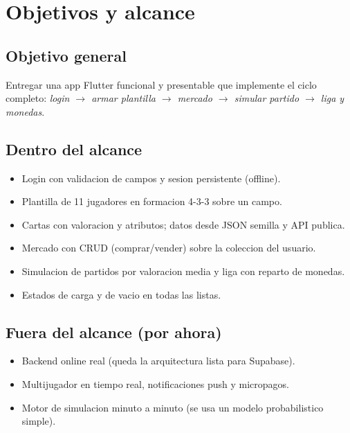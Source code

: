 \documentclass[11pt,a4paper]{article}
\begin{document}
\section{Objetivos y alcance}
\subsection*{Objetivo general}
Entregar una app Flutter funcional y presentable que implemente el ciclo completo:
\emph{login $\rightarrow$ armar plantilla $\rightarrow$ mercado $\rightarrow$ simular
partido $\rightarrow$ liga y monedas}.

\subsection*{Dentro del alcance}
\begin{itemize}[leftmargin=1.2em]
  \item Login con validacion de campos y sesion persistente (offline).
  \item Plantilla de 11 jugadores en formacion 4-3-3 sobre un campo.
  \item Cartas con valoracion y atributos; datos desde JSON semilla y API publica.
  \item Mercado con CRUD (comprar/vender) sobre la coleccion del usuario.
  \item Simulacion de partidos por valoracion media y liga con reparto de monedas.
  \item Estados de carga y de vacio en todas las listas.
\end{itemize}

\subsection*{Fuera del alcance (por ahora)}
\begin{itemize}[leftmargin=1.2em]
  \item Backend online real (queda la arquitectura lista para Supabase).
  \item Multijugador en tiempo real, notificaciones push y micropagos.
  \item Motor de simulacion minuto a minuto (se usa un modelo probabilistico simple).
\end{itemize}

\end{document}
